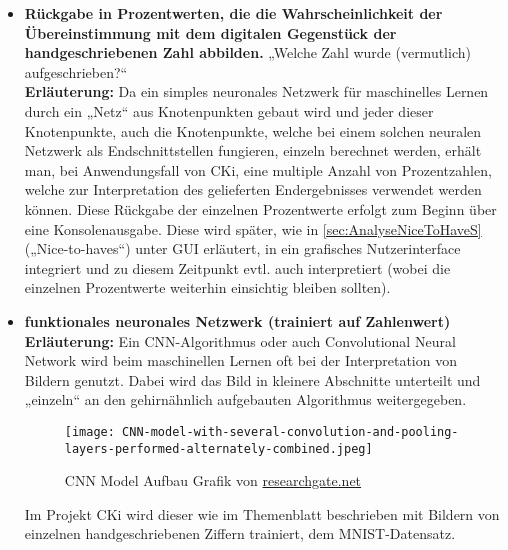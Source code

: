 \begin{itemize}
	\item 
	\textbf{Rückgabe in Prozentwerten, die die Wahrscheinlichkeit der Übereinstimmung mit dem digitalen Gegenstück der handgeschriebenen Zahl abbilden.} „Welche Zahl wurde (vermutlich) aufgeschrieben?“
	\\
	\textbf{Erläuterung:}
	Da ein simples neuronales Netzwerk für maschinelles Lernen durch ein „Netz“ aus Knotenpunkten gebaut wird und jeder dieser Knotenpunkte, auch die Knotenpunkte, welche bei einem solchen neuralen Netzwerk als Endschnittstellen fungieren, einzeln berechnet werden, erhält man, bei Anwendungsfall von CKi, eine multiple Anzahl von Prozentzahlen, welche zur Interpretation des gelieferten Endergebnisses verwendet werden können. Diese Rückgabe der einzelnen Prozentwerte erfolgt zum Beginn über eine Konsolenausgabe. Diese wird später, wie in \ref{sec:AnalyseNiceToHaveS} („Nice-to-haves“) unter GUI erläutert, in ein grafisches Nutzerinterface integriert und zu diesem Zeitpunkt evtl. auch interpretiert (wobei die einzelnen Prozentwerte weiterhin einsichtig bleiben sollten).
	
	\item \textbf{funktionales neuronales Netzwerk (trainiert auf Zahlenwert)}
	\\
	\textbf{Erläuterung:}
	Ein CNN-Algorithmus oder auch Convolutional Neural Network wird beim maschinellen Lernen oft bei der Interpretation von Bildern genutzt. Dabei wird das Bild in kleinere Abschnitte unterteilt und „einzeln“ an den gehirnähnlich aufgebauten Algorithmus weitergegeben.
	\begin{figure}[H]
		\centering
		\texttt{[image: CNN-model-with-several-convolution-and-pooling-layers-performed-alternately-combined.jpeg]}
		\caption{CNN Model Aufbau Grafik von \href{https://www.researchgate.net/publication/309751512_Content-Aware_Convolutional_Neural_Network_for_Object_Recognition_Task}{researchgate.net}}
		\label{fig:AnalyseCNN-model-with-several-convolution-and-pooling-layers-performed-alternately-combined}
	\end{figure}
	Im Projekt CKi wird dieser wie im Themenblatt beschrieben mit Bildern von einzelnen handgeschriebenen Ziffern trainiert, dem MNIST-Datensatz.
	

\end{itemize}
